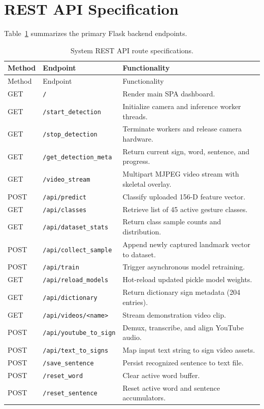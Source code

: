 \section{REST API Specification}
Table~\ref{tab:api-routes} summarizes the primary Flask backend endpoints.

\begin{longtable}{p{}p{}p{}}
\caption{System REST API route specifications.}\label{tab:api-routes}\\
\toprule Method & Endpoint & Functionality\\\midrule
\endfirsthead
\toprule Method & Endpoint & Functionality\\\midrule
\endhead
\bottomrule
\endfoot
GET & \texttt{/} & Render main SPA dashboard.\\
GET & \texttt{/start\_detection} & Initialize camera and inference worker threads.\\
GET & \texttt{/stop\_detection} & Terminate workers and release camera hardware.\\
GET & \texttt{/get\_detection\_meta} & Return current sign, word, sentence, and progress.\\
GET & \texttt{/video\_stream} & Multipart MJPEG video stream with skeletal overlay.\\
POST & \texttt{/api/predict} & Classify uploaded 156-D feature vector.\\
GET & \texttt{/api/classes} & Retrieve list of 45 active gesture classes.\\
GET & \texttt{/api/dataset\_stats} & Return class sample counts and distribution.\\
POST & \texttt{/api/collect\_sample} & Append newly captured landmark vector to dataset.\\
POST & \texttt{/api/train} & Trigger asynchronous model retraining.\\
GET & \texttt{/api/reload\_models} & Hot-reload updated pickle model weights.\\
GET & \texttt{/api/dictionary} & Return dictionary sign metadata (204 entries).\\
GET & \texttt{/api/videos/<name>} & Stream demonstration video clip.\\
POST & \texttt{/api/youtube\_to\_sign} & Demux, transcribe, and align YouTube audio.\\
POST & \texttt{/api/text\_to\_signs} & Map input text string to sign video assets.\\
POST & \texttt{/save\_sentence} & Persist recognized sentence to text file.\\
POST & \texttt{/reset\_word} & Clear active word buffer.\\
POST & \texttt{/reset\_sentence} & Reset active word and sentence accumulators.\\
\end{longtable}

